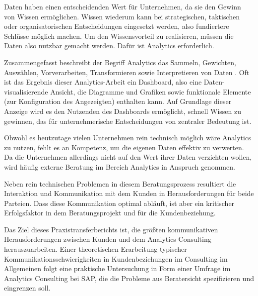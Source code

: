 \documentclass[../main.tex]{subfiles}
\begin{document}
Daten haben einen entscheidenden Wert für Unternehmen, da sie den Gewinn von Wissen ermöglichen.
Wissen wiederum kann bei strategischen, taktischen oder organisatorischen Entscheidungen eingesetzt werden, also fundiertere Schlüsse möglich machen.
Um den Wissensvorteil zu realisieren, müssen die Daten also nutzbar gemacht werden. 
Dafür ist Analytics erforderlich.
\autocite{monino2021data, gupta2020digital, sarikaya2018we}

Zusammengefasst beschreibt der Begriff Analytics das Sammeln, Gewichten, Auswählen, Vorverarbeiten, Transformieren sowie Interpretieren von Daten \autocite{tsai2015big}.
Oft ist das Ergebnis dieser Analytics-Arbeit ein Dashboard, also eine Daten-visualisierende Ansicht, die Diagramme und Grafiken sowie funktionale Elemente (zur Konfiguration des Angezeigten) enthalten kann.
Auf Grundlage dieser Anzeige wird es den Nutzenden des Dashboards ermöglicht, schnell Wissen zu gewinnen, das für unternehmerische Entscheidungen von zentraler Bedeutung ist.
\autocite{sarikaya2018we}

Obwohl es heutzutage vielen Unternehmen rein technisch möglich wäre Analytics zu nutzen, fehlt es an Kompetenz, um die eigenen Daten effektiv zu verwerten.
Da die Unternehmen allerdings nicht auf den Wert ihrer Daten verzichten wollen, wird häufig externe Beratung im Bereich Analytics in Anspruch genommen.
\autocite{gupta2020achieving,chen2012business}

Neben rein technischen Problemen in diesem Beratungsprozess resultiert die Interaktion und Kommunikation mit dem Kunden in Herausforderungen für beide Parteien.
Dass diese Kommunikation optimal abläuft, ist aber ein kritischer Erfolgsfaktor in dem Beratungsprojekt und für die Kundenbeziehung.
\autocite{appelbaum2005critical}

Das Ziel dieses Praxistransferberichts ist, die größten kommunikativen Herausforderungen zwischen Kunden und dem Analytics Consulting herauszuarbeiten.
Einer theoretischen Erarbeitung typischer Kommunikationsschwierigkeiten in Kundenbeziehungen im Consulting im Allgemeinen folgt eine praktische Untersuchung in Form einer Umfrage im Analytics Consulting bei SAP, die die Probleme aus Beratersicht spezifizieren und eingrenzen soll. 
\end{document}
